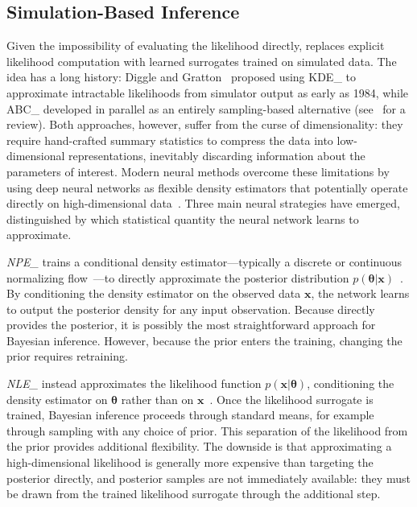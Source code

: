 
\subsection{Simulation-Based Inference}
\label{sec:3.2.2}

Given the impossibility of evaluating the likelihood directly, \SBI replaces explicit likelihood computation with learned surrogates trained on simulated data.
The idea has a long history: Diggle and Gratton~\cite{Diggle:1984} proposed using \gls{KDE_} to approximate intractable likelihoods from simulator output as early as 1984, while \gls{ABC_} developed in parallel as an entirely sampling-based alternative (see~\cite{Cranmer:2020} for a review).
Both approaches, however, suffer from the curse of dimensionality: they require hand-crafted summary statistics to compress the data into low-dimensional representations, inevitably discarding information about the parameters of interest.
Modern neural \SBI methods overcome these limitations by using deep neural networks as flexible density estimators that potentially operate directly on high-dimensional data~\cite{Cranmer:2020}.
Three main neural strategies have emerged, distinguished by which statistical quantity the neural network learns to approximate.

\emph{\Gls{NPE_}} trains a conditional density estimator---typically a discrete or continuous normalizing flow~\cite{Papamakarios:2021,Lipman:2023hef}---to directly approximate the posterior distribution $p(\boldsymbol{\theta}|\mathbf{x})$~\cite{Greenberg:2019}.
By conditioning the density estimator on the observed data $\mathbf{x}$, the network learns to output the posterior density for any input observation.
Because \NPE directly provides the posterior, it is possibly the most straightforward approach for Bayesian inference.
However, because the prior enters the training, changing the prior requires retraining.

\emph{\Gls{NLE_}} instead approximates the likelihood function $p(\mathbf{x}|\boldsymbol{\theta})$, conditioning the density estimator on $\boldsymbol{\theta}$ rather than on $\mathbf{x}$~\cite{Cranmer:2020}.
Once the likelihood surrogate is trained, Bayesian inference proceeds through standard means, for example through \MCMC sampling with any choice of prior.
This separation of the likelihood from the prior provides additional flexibility. The downside is that approximating a high-dimensional likelihood is generally more expensive than targeting the posterior directly, and posterior samples are not immediately available: they must be drawn from the trained likelihood surrogate through the additional \MCMC step.

